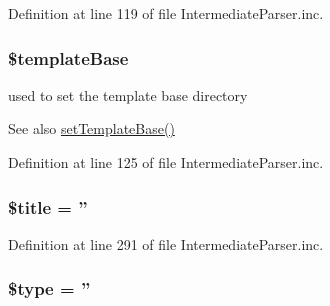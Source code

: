 \-Definition at line 119 of file \-Intermediate\-Parser.\-inc.

\hypertarget{classphp_documentor___intermediate_parser_ac13127aa22e272d4a47bc7577d7f4b2a}{
\subsubsection[{\$template\-Base}]{\setlength{\rightskip}{0pt plus 5cm}\$template\-Base}}\label{classphp_documentor___intermediate_parser_ac13127aa22e272d4a47bc7577d7f4b2a}
used to set the template base directory \begin{DoxySeeAlso}{\-See also}
\hyperlink{classphp_documentor___intermediate_parser_a97d9600189aa312e697768b0e5d3656f}{set\-Template\-Base()} 
\end{DoxySeeAlso}


\-Definition at line 125 of file \-Intermediate\-Parser.\-inc.

\hypertarget{classphp_documentor___intermediate_parser_ada57e7bb7c152edad18fe2f166188691}{
\subsubsection[{\$title}]{\setlength{\rightskip}{0pt plus 5cm}\$title = ''}}\label{classphp_documentor___intermediate_parser_ada57e7bb7c152edad18fe2f166188691}


\-Definition at line 291 of file \-Intermediate\-Parser.\-inc.

\hypertarget{classphp_documentor___intermediate_parser_a9a4a6fba2208984cabb3afacadf33919}{
\subsubsection[{\$type}]{\setlength{\rightskip}{0pt plus 5cm}\$type = ''}}\label{classphp_documentor___intermediate_parser_a9a4a6fba2208984cabb3afacadf33919}


